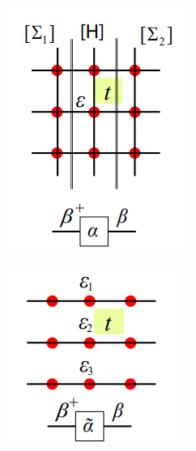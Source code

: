 \documentclass{beamer}
\begin{document}
{\begin{frame}
\begin{figure}[!htbp]
   \begin{subfigure}{0.15\textwidth}
   \includegraphics[width=\linewidth]{2d_init_basis.png}
   \end{subfigure}
   \hspace{1cm}
   \begin{subfigure}{0.15\textwidth}
   \includegraphics[width=\linewidth]{2d_change_basis.png}

\end{subfigure}
\end{figure}
\end{frame}}
\end{document}
